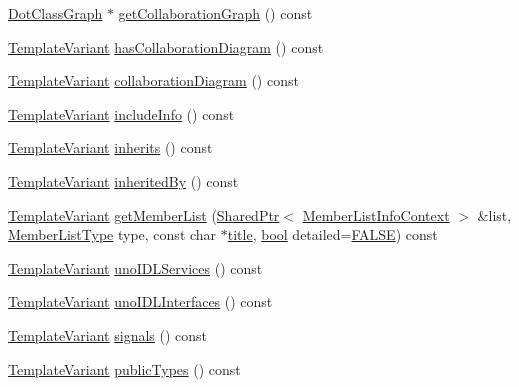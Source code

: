 \begin{DoxyCompactItemize}
\item 
\hyperlink{class_dot_class_graph}{Dot\+Class\+Graph} $\ast$ \hyperlink{class_class_context_1_1_private_ae99cfeba0550b9f49d69a43249694eeb}{get\+Collaboration\+Graph} () const 
\item 
\hyperlink{class_template_variant}{Template\+Variant} \hyperlink{class_class_context_1_1_private_a19dbb99f8206dfe6f1ac3f7070c99cc6}{has\+Collaboration\+Diagram} () const 
\item 
\hyperlink{class_template_variant}{Template\+Variant} \hyperlink{class_class_context_1_1_private_a544cbd59ada59d5b4f4ad590ad40a647}{collaboration\+Diagram} () const 
\item 
\hyperlink{class_template_variant}{Template\+Variant} \hyperlink{class_class_context_1_1_private_a5a2124a7ee78b67983f4f15cbc2e6e96}{include\+Info} () const 
\item 
\hyperlink{class_template_variant}{Template\+Variant} \hyperlink{class_class_context_1_1_private_a8346edc62ed862eb5aaac3646e0a7cdd}{inherits} () const 
\item 
\hyperlink{class_template_variant}{Template\+Variant} \hyperlink{class_class_context_1_1_private_aabc8b2b5b0e739bfc43841ec78be7265}{inherited\+By} () const 
\item 
\hyperlink{class_template_variant}{Template\+Variant} \hyperlink{class_class_context_1_1_private_a9c93478688f2cd39a678d0b6f2be579c}{get\+Member\+List} (\hyperlink{class_shared_ptr}{Shared\+Ptr}$<$ \hyperlink{class_member_list_info_context}{Member\+List\+Info\+Context} $>$ \&list, \hyperlink{types_8h_abe8ad5992f8938a28f918f51b199aa19}{Member\+List\+Type} type, const char $\ast$\hyperlink{class_class_context_1_1_private_af2bc1bcede0472711acb270ba1ccddd9}{title}, \hyperlink{qglobal_8h_a1062901a7428fdd9c7f180f5e01ea056}{bool} detailed=\hyperlink{qglobal_8h_a10e004b6916e78ff4ea8379be80b80cc}{F\+A\+L\+S\+E}) const 
\item 
\hyperlink{class_template_variant}{Template\+Variant} \hyperlink{class_class_context_1_1_private_abc6078467559441436b92bfe5e5a1c2e}{uno\+I\+D\+L\+Services} () const 
\item 
\hyperlink{class_template_variant}{Template\+Variant} \hyperlink{class_class_context_1_1_private_a816007a0ba293978d32aec703303399d}{uno\+I\+D\+L\+Interfaces} () const 
\item 
\hyperlink{class_template_variant}{Template\+Variant} \hyperlink{class_class_context_1_1_private_a2157958dd3eee8e93123ad586e939909}{signals} () const 
\item 
\hyperlink{class_template_variant}{Template\+Variant} \hyperlink{class_class_context_1_1_private_a3e5a2483ade875779bb537f0b389a272}{public\+Types} () const 

\end{DoxyCompactItemize}
